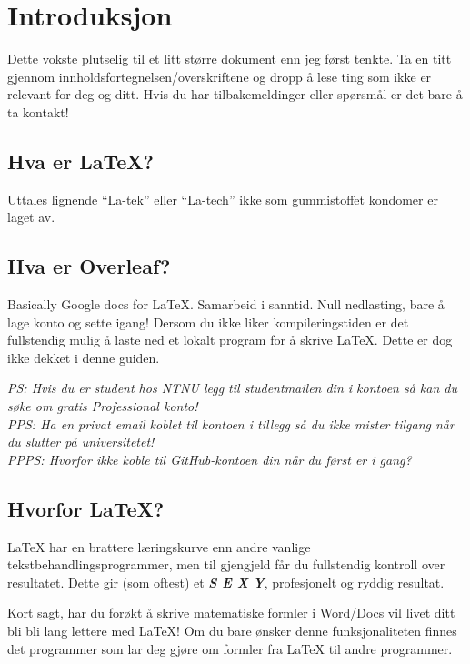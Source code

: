 \section{Introduksjon}
    Dette vokste plutselig til et litt større dokument enn jeg først tenkte. Ta en titt gjennom innholdsfortegnelsen/overskriftene og dropp å lese ting som ikke er relevant for deg og ditt.
    Hvis du har tilbakemeldinger eller spørsmål er det bare å ta kontakt!
    
    \subsection{Hva er \LaTeX?}
        Uttales lignende ``La-tek'' eller ``La-tech'' \underline{ikke} som gummistoffet kondomer er laget av. 
    
    \subsection{Hva er Overleaf?}
        Basically Google docs for \LaTeX. Samarbeid i sanntid. Null nedlasting, bare å lage konto og sette igang! 
        Dersom du ikke liker kompileringstiden er det fullstendig mulig å laste ned et lokalt program for å skrive \LaTeX.
        Dette er dog ikke dekket i denne guiden.
        
        \textit{PS: Hvis du er student hos NTNU legg til studentmailen din i kontoen så kan du søke om gratis Professional konto!\\
        PPS: Ha en privat email koblet til kontoen i tillegg så du ikke mister tilgang når du slutter på universitetet!\\
        PPPS: Hvorfor ikke koble til GitHub-kontoen din når du først er i gang?}
    
    \subsection{Hvorfor \LaTeX?}
        \LaTeX\hspace{1pt} har en brattere læringskurve enn andre vanlige tekstbehandlingsprogrammer, men til gjengjeld får du fullstendig kontroll over resultatet. Dette gir (som oftest) et \textit{\textbf{S E  X Y}}, profesjonelt og ryddig resultat.
        
        Kort sagt, har du forøkt å skrive matematiske formler i Word/Docs vil livet ditt bli bli lang lettere med \LaTeX!
        Om du bare ønsker denne funksjonaliteten finnes det programmer som lar deg gjøre om formler fra \LaTeX\hspace{1pt} til andre programmer.
        
